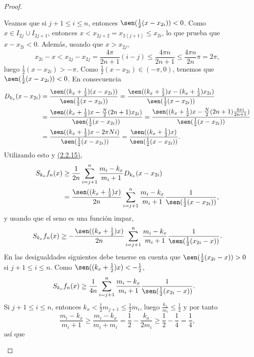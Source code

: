 \documentclass[a4paper, 12pt]{book}
\begin{document}
\begin{proof}
\begin{itemize}
        Veamos que si $j+1 \leq i \leq n$, entonces $\sen(\frac{1}{2}(x-x_{2i})) < 0$. Como $x \in I_{2j} \cup I_{2j+1}$, entonces $x < x_{2j+2} = x_{2(j+1)} \leq x_{2i}$, lo que prueba que $x - x_{2i} < 0$. Además, usando que $x >x_{2j}$,
        \[x_{2i}-x <x_{2j}-x_{2j} = \frac{4\pi}{2n+1}(i-j) \leq \frac{4\pi n}{2n+1} \leq \frac{4\pi n}{2n}\pi = 2\pi,\]
        luego $\frac{1}{2}(x-x_{2i}) > -\pi$. Como $\frac{1}{2}(x-x_{2i}) \in (-\pi,0)$, tenemos que $\sen(\frac{1}{2}(x-x_{2i})) < 0$. En consecuencia
        \begin{align*}
            D_{k_x}(x-x_{2i}) &= \frac{\sen((k_x+\frac{1}{2})(x-x_{2i}))}{\sen(\frac{1}{2}(x-x_{2i}))} = \frac{\sen((k_x+\frac{1}{2})x-(k_x+\frac{1}{2})x_{2i})}{\sen(\frac{1}{2}(x-x_{2i}))} \\
            &= \frac{\sen((k_x+\frac{1}{2})x-\frac{N}{2}(2n+1)x_{2i})}{\sen(\frac{1}{2}(x-x_{2i}))} = \frac{\sen((k_x+\frac{1}{2})x-\frac{N}{2}(2n+1)\frac{4\pi i}{2n+1})}{\sen(\frac{1}{2}(x-x_{2i}))} \\
            &= \frac{\sen((k_x+\frac{1}{2})x-2\pi N i)}{\sen(\frac{1}{2}(x-x_{2i}))} = \frac{\sen((k_x+\frac{1}{2})x)}{\sen(\frac{1}{2}(x-x_{2i}))}.
        \end{align*}
        Utilizando esto y \hyperref[2.2.15]{(2.2.15)},
        \begin{align*}
            S_{k_x}f_n(x) &\geq \frac{1}{2n}\sum_{i=j+1}^n \frac{m_i-k_x}{m_i+1}D_{k_x}(x-x_{2i}) \\
            &= \frac{\sen((k_x+\frac{1}{2})x)}{2n}\sum_{i=j+1}^n \frac{m_i-k_x}{m_i+1}\frac{1}{\sen(\frac{1}{2}(x-x_{2i}))},
        \end{align*}
        y usando que el seno es una función impar,
        \[S_{k_x}f_n(x) \geq -\frac{\sen((k_x+\frac{1}{2})x)}{2n}\sum_{i=j+1}^n \frac{m_i-k_x}{m_i+1}\frac{1}{\sen(\frac{1}{2}(x_{2i}-x))}.\]
        En las desigualdades siguientes debe tenerse en cuenta que $\sen(\frac{1}{2}(x_{2i}-x)) > 0$ si $j+1 \leq i \leq n$. Como $\sen((k_x+\frac{1}{2})x) < -\frac{1}{2}$,
        \begin{align*}
            S_{k_x}f_n(x) &\geq \frac{1}{4n}\sum_{i=j+1}^n \frac{m_i-k_x}{m_i+1}\frac{1}{\sen(\frac{1}{2}(x_{2i}-x))}.
        \end{align*}
       Si $j+1 \leq i \leq n$, entonces $k_x < \frac{1}{2}m_{j+1} \leq \frac{1}{2}m_i$, luego $\frac{k_x}{m_i} \leq \frac{1}{2}$ y por tanto
            \[\frac{m_i-k_x}{m_i+1} \geq \frac{m_i-k_x}{m_i+m_i} = \frac{1}{2}-\frac{k_x}{2m_i} \geq \frac{1}{2}-\frac{1}{4} = \frac{1}{4},\]
        así que

\end{itemize}
\end{proof}
\end{document}
